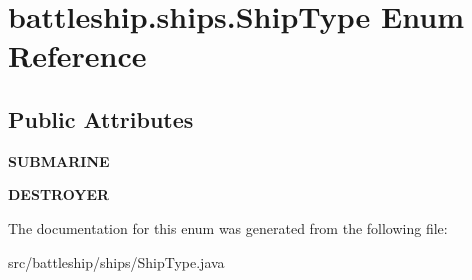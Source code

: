 \hypertarget{enumbattleship_1_1ships_1_1ShipType}{}\section{battleship.\+ships.\+Ship\+Type Enum Reference}
\label{enumbattleship_1_1ships_1_1ShipType}
\subsection*{Public Attributes}
\begin{DoxyCompactItemize}
\item 
\hypertarget{enumbattleship_1_1ships_1_1ShipType_a4b59df3662edd4bab7fc08808a67ac9b}{}{\bfseries S\+U\+B\+M\+A\+R\+I\+N\+E}\label{enumbattleship_1_1ships_1_1ShipType_a4b59df3662edd4bab7fc08808a67ac9b}

\item 
\hypertarget{enumbattleship_1_1ships_1_1ShipType_a3d2a06701fb2ed8c3e2d18c1f732ec39}{}{\bfseries D\+E\+S\+T\+R\+O\+Y\+E\+R}\label{enumbattleship_1_1ships_1_1ShipType_a3d2a06701fb2ed8c3e2d18c1f732ec39}

\end{DoxyCompactItemize}


The documentation for this enum was generated from the following file\+:\begin{DoxyCompactItemize}
\item 
src/battleship/ships/Ship\+Type.\+java\end{DoxyCompactItemize}
